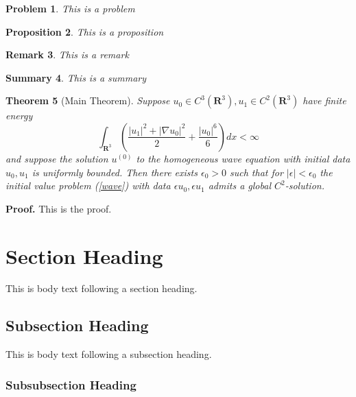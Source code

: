 \documentclass{article}
\newtheorem{theorem}{Theorem}
\newtheorem{problem}[theorem]{Problem}
\newtheorem{proposition}[theorem]{Proposition}
\newtheorem{remark}[theorem]{Remark}
\newtheorem{summary}[theorem]{Summary}
\newenvironment{proof}[1][]{\textbf{Proof.} }{}
\begin{document}
\begin{problem}
This is a problem
\end{problem}

\begin{proposition}
This is a proposition
\end{proposition}

\begin{remark}
This is a remark
\end{remark}

\begin{summary}
This is a summary
\end{summary}

\begin{theorem}[Main Theorem]
\label{existence}Suppose $u_{0}\in C^{3}\left( \mathbf{R}^{3}\right)
,u_{1}\in C^{2}\left( \mathbf{R}^{3}\right) $ have finite energy 
\begin{equation}
\int_{\mathbf{R}^{3}}\left( \frac{\left| u_{1}\right| ^{2}+\left| \nabla
u_{0}\right| ^{2}}{2}+\frac{\left| u_{0}\right| ^{6}}{6}\right) dx<\infty 
\tag{9}
\end{equation}
and suppose the solution $u^{(0)}$ to the homogeneous wave equation with
initial data $u_{0},u_{1}$ is uniformly bounded. Then there exists $\epsilon
_{0}>0$ such that for $\left| \epsilon \right| <\epsilon _{0}$ the initial
value problem (\ref{wave}) with data $\epsilon u_{0},\epsilon u_{1}$ admits
a global $C^{2}$-solution.
\end{theorem}

\begin{proof}[Proof of the Main Theorem]
This is the proof.
\end{proof}

\section{Section Heading}

This is body text following a section heading. \label{sectA}

\subsection{Subsection Heading}

This is body text following a subsection heading.\label{ssectA}

\subsubsection{Subsubsection Heading}
\end{document}
